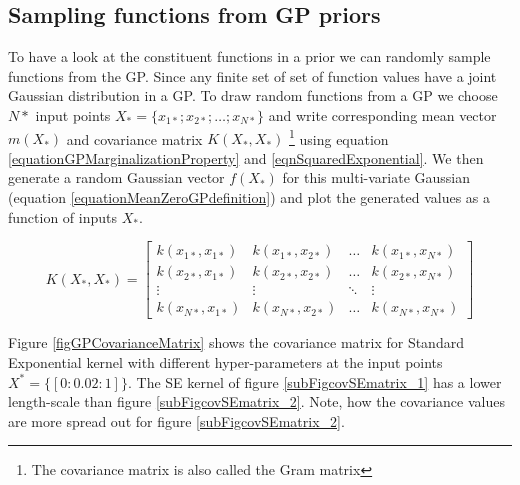 \subsection{Sampling functions from GP priors}\label{subSecSamplingFunctionsGPPrior}
To have a look at the constituent functions in a prior we can randomly sample functions from the GP. Since any finite set of set of function values have a joint Gaussian distribution in a GP. To draw random functions from a GP we choose \(N*\) input points \(X_{*} = \{x_{1*}; x_{2*}; \ldots ; x_{N*}\}\) and write corresponding mean vector \(m(X_{*})\) and covariance matrix \(K(X_{*}, X_{*} )\) \footnote{The covariance matrix is also called the Gram matrix} using equation \ref{equationGPMarginalizationProperty} and \ref{eqnSquaredExponential}. We then generate a random Gaussian vector \(f(X_{*})\) for this multi-variate Gaussian (equation \ref{equationMeanZeroGPdefinition}) and plot the generated values as a function of inputs \(X_{*}\). 

\begin{equation}\label{eqnCovMatrixSquaredExponential}
K(X_{*}, X_{*} ) = \left [ \begin{matrix}
k(x_{1*}, x_{1*}) & k(x_{1*}, x_{2*}) & \ldots & k(x_{1*}, x_{N*})
\\ k(x_{2*}, x_{1*}) & k(x_{2*}, x_{2*}) & \ldots & k(x_{2*}, x_{N*})
\\ \vdots & \vdots & \ddots & \vdots
\\ k(x_{N*}, x_{1*}) & k(x_{N*}, x_{2*}) & \ldots & k(x_{N*}, x_{N*})
\end{matrix} \right ] 
\end{equation}

Figure \ref{figGPCovarianceMatrix} shows the covariance matrix for Standard Exponential kernel with different hyper-parameters at the input points \(X^{*} = \{[0:0.02:1]\}\). The SE kernel of figure \ref{subFigcovSEmatrix_1} has a lower length-scale than figure \ref{subFigcovSEmatrix_2}. Note, how the covariance values are more spread out for figure \ref{subFigcovSEmatrix_2}.

